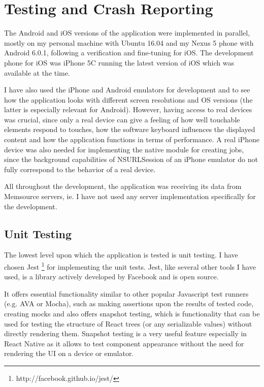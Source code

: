 \chapter{Testing and Crash Reporting}

The Android and iOS versions of the application were implemented in parallel, mostly on my personal machine with Ubuntu 16.04 and my Nexus 5 phone with Android 6.0.1, following a verification and fine-tuning for iOS. The development phone for iOS was iPhone 5C running the latest version of iOS which was available at the time. 

I have also used the iPhone and Android emulators for development and to see how the application looks with different screen resolutions and OS versions (the latter is especially relevant for Android). However, having access to real devices was crucial, since only a real device can give a feeling of how well touchable elements respond to touches, how the software keyboard influences the displayed content and how the application functions in terms of performance. A real iPhone device was also needed for implementing the native module for creating jobs, since the background capabilities of NSURLSession of an iPhone emulator do not fully correspond to the behavior of a real device.

All throughout the development, the application was receiving its data from Memsource servers, ie. I have not used any server implementation specifically for the development.


\section{Unit Testing}
The lowest level upon which the application is tested is unit testing. I have chosen Jest \footnote{http://facebook.github.io/jest/} for implementing the unit tests. Jest, like several other tools I have used, is a library actively developed by Facebook and is open source. 

It offers essential functionality similar to other popular Javascript test runners (e.g. AVA or Mocha), such as making assertions upon the results of tested code, creating mocks and also offers snapshot testing, which is functionality that can be used for testing the structure of React trees (or any serializable values) without directly rendering them. Snapshot testing is a very useful feature especially in React Native as it allows to test component appearance without the need for rendering the UI on a device or emulator. 


